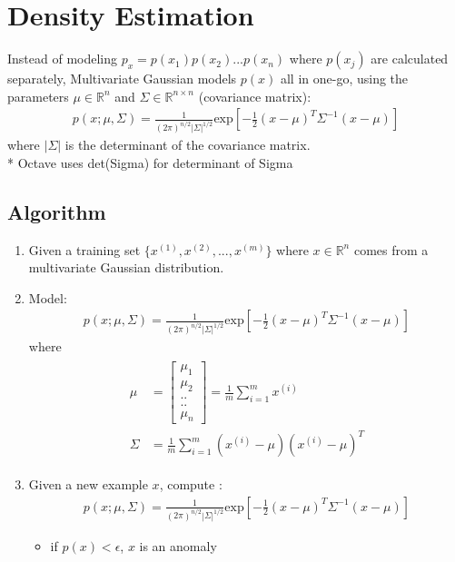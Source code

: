 \documentclass[a4paper,12pt]{report}
\begin{document}
\section{Density Estimation}
Instead of modeling $p_x = p(x_1)p(x_2)...p(x_n)$ where $p(x_j)$ are calculated separately, Multivariate Gaussian models $p(x)$ all in one-go, using the parameters $\mu \in \mathbb{R}^n$ and $\Sigma \in \mathbb{R}^{n \times n}$ (covariance matrix): 
\begin{align}
p(x; \mu, \Sigma) = \frac{1}{(2 \pi)^{n/2} |\Sigma|^{1/2}} \text{exp} \left[-\frac{1}{2}(x-\mu)^T \Sigma ^{-1} (x - \mu) \right] 
\end{align}
where $|\Sigma|$ is the determinant of the covariance matrix. \\
* Octave uses det(Sigma) for determinant of Sigma
\subsection{Algorithm}
\begin{enumerate}
\item Given a training set $\{x^{(1)}, x^{(2)}, ..., x^{(m)}  \}$ where $x \in \mathbb{R}^n$ comes from a multivariate Gaussian distribution.
\item Model: 
\begin{align}
p(x; \mu, \Sigma) = \frac{1}{(2 \pi)^{n/2} |\Sigma|^{1/2}} \text{exp} \left[ -\frac{1}{2}(x-\mu)^T \Sigma ^{-1} (x - \mu) \right]
\end{align}
where
\begin{align}
\begin{split}
\mu &= \left[ \begin{smallmatrix} \mu_1\\ \mu_2 \\..\\..\\ \mu_n \end{smallmatrix} \right] = \frac{1}{m} \sum_{i=1} ^m x^{(i)} \\
\Sigma &= \frac{1}{m} \sum_{i=1} ^{m} (x^{(i)} - \mu)(x^{(i)} - \mu)^T
\end{split}
\end{align}
\item Given a new example $x$, compute :
\begin{align}
p(x; \mu, \Sigma) = \frac{1}{(2 \pi)^{n/2} |\Sigma|^{1/2}} \text{exp} \left[-\frac{1}{2}(x-\mu)^T \Sigma ^{-1} (x - \mu) \right] 
\end{align}
\begin{itemize}
 \item if $p(x) < \epsilon $, $x$ is an anomaly
\end{itemize}
\end{enumerate}
\end{document}
